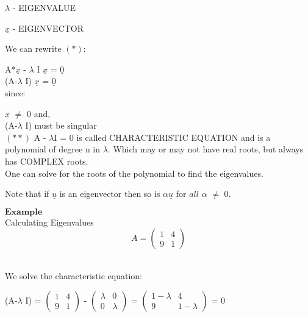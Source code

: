 \documentclass[]{article}
\begin{document}
\(\lambda\) - EIGENVALUE\\
 \hspace{1cm}

\(\underline{x}\) - EIGENVECTOR\\
 \hspace{1cm}

We can rewrite \((*)\):\\
 \hspace{1cm}

A*\(\underline{x}\) - \(\lambda\) I \(\underline{x}\) =
\(\underline{0}\)\\
 (A-\(\lambda\) I) \(\underline{x}\) = \(\underline{0}\)\\
 since:

\(\underline{x}\) \(\not=\) \(\underline{0}\) and,\\
 (A-\(\lambda\) I) must be singular\\
 \((**)\) \textbar{}A - \(\lambda\)I\textbar{} = 0 is called
CHARACTERISTIC EQUATION and is a polynomial of degree n in \(\lambda\).
Which may or may not have real roots, but always has COMPLEX roots.\\
 One can solve for the roots of the polynomial to find the eigenvalues.

Note that if \(\underline{u}\) is an eigenvector then so is
\(\alpha\)\(\underline{u}\) for \(all\) \(\alpha\) \(\not=\) 0.

\(\mathbf{Example}\)\\
 Calculating Eigenvalues\\
 \[A =\begin{pmatrix} 1 & 4 \\ 9 & 1\end{pmatrix}\]\\
 \hspace{3cm}

We solve the characteristic equation:\\
 \hspace{3cm}

(A-\(\lambda\) I) =
\textbar{}\(\begin{pmatrix} 1 & 4 \\ 9 & 1\end{pmatrix}\) -
\(\begin{pmatrix} \lambda & 0 \\ 0 & \lambda\end{pmatrix}\)\textbar{} =
\textbar{}\(\begin{pmatrix} 1-\lambda & 4 \\ 9 & 1-\lambda\end{pmatrix}\)\textbar{}
= 0\\
\end{document}
